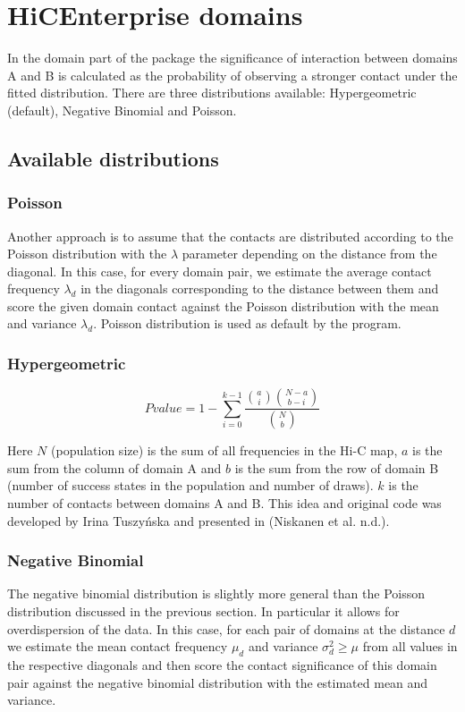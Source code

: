 \chapter{HiCEnterprise domains}
\label{domains}

In the domain part of the package the significance of interaction between domains A and B is calculated as the
probability of observing a stronger contact under the fitted distribution. There are three distributions available:
Hypergeometric (default), Negative Binomial and Poisson.

\section{Available distributions}

\subsection{Poisson}
Another approach is to assume that the contacts are distributed according to the Poisson distribution with the $\lambda$ parameter depending on the distance from the diagonal. In this case, for every domain pair, we estimate the average contact frequency $\lambda_d$ in the diagonals corresponding to the distance between them and score the given domain contact against the Poisson distribution with the mean and variance $\lambda_d$. Poisson distribution is used as default by the program.

\subsection{Hypergeometric}

\begin{equation}
Pvalue = 1 - \sum_{i=0}^{k-1} \frac{{a\choose i}{N-a\choose b-i }}{{N\choose b}}
\end{equation}

Here $N$ (population size) is the sum of all frequencies in the Hi-C map, $a$ is the sum from the column of domain A and
$b$ is the sum from the row of domain B (number of success states in the population and number of draws). $k$ is the number of contacts between domains A and B. This idea
and original code was developed by Irina Tuszyńska and presented in (Niskanen et al. n.d.).

\subsection{Negative Binomial}
The negative binomial distribution is slightly more general than the Poisson distribution discussed in the previous section. In particular it allows for overdispersion of the data. In this case, for each pair of domains at the distance $d$ we estimate the mean contact frequency $\mu_d$ and variance $\sigma^2_d \geq \mu$ from all values in the respective diagonals and then score the contact significance of this domain pair against the negative binomial distribution with the estimated mean and variance. 


